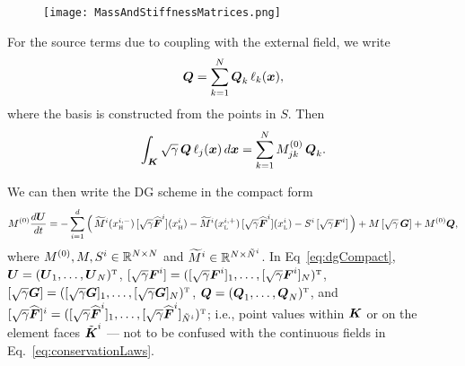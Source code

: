 \documentclass[10pt,preprint]{aastex}
\begin{document}
\begin{figure}[h]
  \begin{center}
     \texttt{[image: MassAndStiffnessMatrices.png]}
  \end{center}
  \caption{}
  \label{fig:MassStiffMats}
\end{figure}

For the source terms due to coupling with the external field, we write
\begin{equation}
  \boldsymbol{Q}=\sum_{k=1}^{N}\boldsymbol{Q}_{k}\,\ell_{k}(\boldsymbol{x}),
\end{equation}
where the basis is constructed from the points in $S$.  
Then
\begin{equation}
  \int_{\boldsymbol{K}}\sqrt{\gamma}\,\boldsymbol{Q}\,\ell_{j}(\boldsymbol{x})\,d\boldsymbol{x}
  =\sum_{k=1}^{N}M_{jk}^{(0)}\,\boldsymbol{Q}_{k}.  
\end{equation}

We can then write the DG scheme in the compact form
\begin{equation}
  M^{(0)}\frac{d \boldsymbol{U}}{d t}
  =-\sum_{i=1}^{d}
  \Big(\,
    \widetilde{M}^{i}(x_{\mbox{\tiny H}}^{i,-})\,[\sqrt{\gamma}\widehat{\boldsymbol{F}}^{i}](x_{\mbox{\tiny H}}^{i})
    -\widetilde{M}^{i}(x_{\mbox{\tiny L}}^{i,+})\,[\sqrt{\gamma}\widehat{\boldsymbol{F}}^{i}](x_{\mbox{\tiny L}}^{i})
    -S^{i}\,[\sqrt{\gamma}\boldsymbol{F}^{i}]    
  \,\Big)
  +M\,[\sqrt{\gamma}\,\boldsymbol{G}]
  +M^{(0)}\boldsymbol{Q},
  \label{eq:dgCompact}
\end{equation}
where $M^{(0)},M,S^{i}\in\mathbb{R}^{N\times N}$ and $\widetilde{M}^{i}\in\mathbb{R}^{N\times\tilde{N}^{i}}$.  
In Eq~\eqref{eq:dgCompact}, $\boldsymbol{U}=(\boldsymbol{U}_{1},\ldots,\boldsymbol{U}_{N})^{\mbox{\tiny T}}$, $[\sqrt{\gamma}\boldsymbol{F}^{i}]=([\sqrt{\gamma}\boldsymbol{F}^{i}]_{1},\ldots,[\sqrt{\gamma}\boldsymbol{F}^{i}]_{N})^{\mbox{\tiny T}}$, $[\sqrt{\gamma}\boldsymbol{G}]=([\sqrt{\gamma}\boldsymbol{G}]_{1},\ldots,[\sqrt{\gamma}\boldsymbol{G}]_{N})^{\mbox{\tiny T}}$, $\boldsymbol{Q}=(\boldsymbol{Q}_{1},\ldots,\boldsymbol{Q}_{N})^{\mbox{\tiny T}}$, and $[\sqrt{\gamma}\widehat{\boldsymbol{F}}]^{i}=([\sqrt{\gamma}\widehat{\boldsymbol{F}}^{i}]_{1},\ldots,[\sqrt{\gamma}\widehat{\boldsymbol{F}}^{i}]_{\tilde{N}^{i}})^{\mbox{\tiny T}}$; i.e., point values within $\boldsymbol{K}$ or on the element faces $\tilde{\boldsymbol{K}}^{i}$ --- not to be confused with the continuous fields in Eq.~\eqref{eq:conservationLaws}.  
\end{document}
